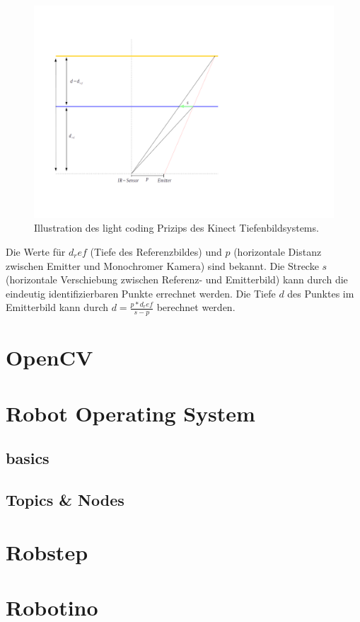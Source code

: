 			\begin{figure}[H]
			\centering
			\includegraphics[width=1.2\linewidth]{../media/kinect-depth-principle}
			\caption{Illustration des light coding Prizips des Kinect Tiefenbildsystems.}
			\label{fig:kinect-depth-principle}
			\end{figure}
			Die Werte für $d_ref$ (Tiefe des Referenzbildes) und $p$ (horizontale Distanz zwischen Emitter und Monochromer Kamera) sind bekannt. Die Strecke $s$ (horizontale Verschiebung zwischen Referenz- und Emitterbild) kann durch die eindeutig identifizierbaren Punkte errechnet werden. Die Tiefe $d$ des Punktes im Emitterbild kann durch $d = \frac{p*d_ref}{s-p}$ berechnet werden.\\
			\cite{kinect-uug-chem}

			
	\section{OpenCV}
	\section{Robot Operating System}
		\subsection{basics}
		\subsection{Topics \& Nodes}
	\section{Robstep}
	\section{Robotino}